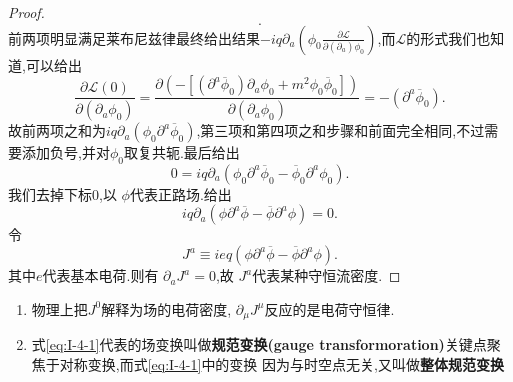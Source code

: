 \documentclass[../main.tex]{subfiles}
\begin{document}
\begin{proof}
\[ .\] 
 前两项明显满足莱布尼兹律最终给出结果$-iq \partial_a (\phi_0 \frac{\partial \mathscr{L}}{\partial (\partial_a)\phi_0} )$,而$\mathscr{L}$的形式我们也知道,可以给出\[
 \frac{\partial \mathscr{L}(0)}{\partial (\partial_a\phi_0)}  =   \frac{\partial (-[(\partial^a \overline{\phi}_0)\partial_a \phi_0 + m^2\phi_0 \overline{\phi}_0])}{\partial (\partial_a\phi_0)} = -(\partial^a \overline{\phi}_0)
 .\] 
 故前两项之和为$iq\partial_a(\phi_0 \partial^a \overline{\phi}_0)$,第三项和第四项之和步骤和前面完全相同,不过需要添加负号,并对$\phi_0$取复共轭.最后给出\[
 0 = iq\partial_a(\phi_0 \partial^a \overline{\phi}_0 - \overline{\phi}_0 \partial^a \phi_0)
 .\] 
 我们去掉下标$0$,以 $\phi$代表正路场.给出 \[
 iq\partial_a(\phi \partial^a \overline{\phi} - \overline{\phi} \partial^a \phi) = 0
 .\] 
 令 \[
 J^a \equiv ieq (\phi \partial^a \overline{\phi} - \overline{\phi} \partial^a \phi)
 .\] 
 其中$e$代表基本电荷.则有 $\partial_a J^a = 0$,故 $J^a$代表某种守恒流密度.
\end{proof}
\begin{remark}
 \begin{enumerate}
   \item 物理上把$J^0$解释为场的电荷密度, $\partial_\mu J^\mu$反应的是电荷守恒律.
   \item 式\ref{eq:I-4-1}代表的场变换叫做\textbf{规范变换(gauge transformoration)}关键点聚焦于对称变换,而式\ref{eq:I-4-1}中的变换
     因为与时空点无关,又叫做\textbf{整体规范变换}
 \end{enumerate} 
\end{remark}
\end{document}
